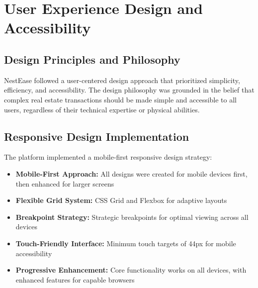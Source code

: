 \documentclass[conference]{IEEEtran}
\begin{document}
\section{User Experience Design and Accessibility}
\subsection{Design Principles and Philosophy}
NestEase followed a user-centered design approach that prioritized simplicity, efficiency, and accessibility. The design philosophy was grounded in the belief that complex real estate transactions should be made simple and accessible to all users, regardless of their technical expertise or physical abilities.

\subsection{Responsive Design Implementation}
The platform implemented a mobile-first responsive design strategy:

\begin{itemize}
    \item \textbf{Mobile-First Approach:} All designs were created for mobile devices first, then enhanced for larger screens
    \item \textbf{Flexible Grid System:} CSS Grid and Flexbox for adaptive layouts
    \item \textbf{Breakpoint Strategy:} Strategic breakpoints for optimal viewing across all devices
    \item \textbf{Touch-Friendly Interface:} Minimum touch targets of 44px for mobile accessibility
    \item \textbf{Progressive Enhancement:} Core functionality works on all devices, with enhanced features for capable browsers
\end{itemize}
\end{document}
